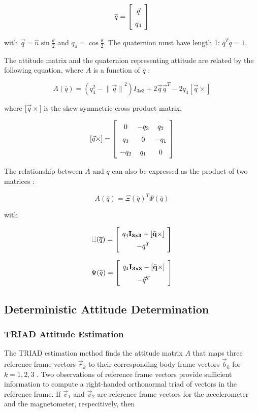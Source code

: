 \documentclass{article}
\newcommand{\mat}[2][ccccccccccccccccccccccccccccccccccccccccccccc]{\left[
        \arraycolsep=4pt\def\arraystretch{1.5}
        \begin{array}{#1} #2 \\ 
        \end{array} 
        \right]}
\begin{document}
\begin{flushleft}
\[ \overline{q} = \mat{\vec{q} \\ q_4} \] 

with $\vec{q} = \hat{n} \sin{\frac{\theta}{2}}$ and $q_4 = \cos{\frac{\theta}{2}}$. The quaternion must have length 1: $\overline{q}^T \overline{q} = 1$. 

The attitude matrix and the quaternion representing attitude are related by the following equation, where $A$ is a function of $\overline{q}$ \cite{Shuster1982}: 

\[ A(\overline{q}) = (q_4^2 - {\| \vec{q} \|}^2) I_{3x3} + 2 \vec{q}\vec{q}^T - 2 q_4 [\vec{q}\times] \]

where ${[\vec{q}\times}]$ is the skew-symmetric cross product matrix, 

\[ [\vec{q}\times] = \mat{ 0 & -q_3 & q_2 \\ q_3 & 0 & -q_1 \\ -q_2 & q_1 & 0} \]

The relationship between $A$ and $\overline{q}$ can also be expressed as the product of two matrices \cite{Markley2007}: 

\[ A(\overline{q}) = \Xi(\overline{q})^{T} \Psi(\overline{q}) \]

with 

\[ \Xi(\overline{q}) = \mat{q_4 \bf{I}_{3x3} + [\vec{q}\times] \\ -\vec{q}^T } \]

\[ \Psi(\overline{q}) = \mat{q_4 \bf{I}_{3x3} - [\vec{q}\times] \\ -\vec{q}^T } \]

\subsection{Deterministic Attitude Determination}

\subsubsection{TRIAD Attitude Estimation}

The TRIAD estimation method finds the attitude matrix $A$ that maps three reference frame vectors $\vec{r}_k$ to their corresponding body frame vectors $\vec{b}_k$ for $k = 1, 2, 3$ \cite{Shuster2004}. Two observations of reference frame vectors provide sufficient information to compute a right-handed orthonormal triad of vectors in the reference frame. If $\vec{v}_1$ and $\vec{v}_2$ are reference frame vectors for the accelerometer and the magnetometer, respecitively, then 


\end{flushleft}
\end{document}
